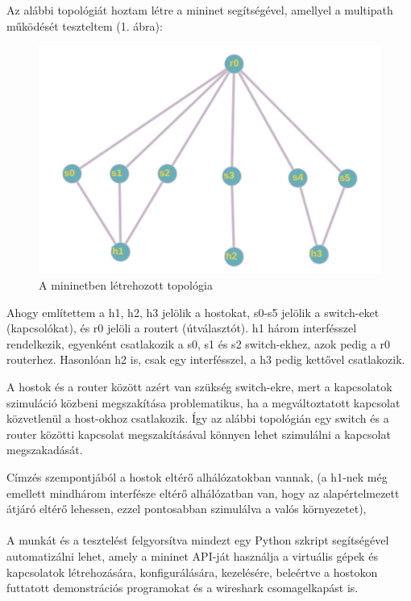 \documentclass[a4paper,oneside]{article}
\begin{document}
Az alábbi topológiát hoztam létre a mininet segítségével, amellyel a multipath működését teszteltem (1. ábra):

\begin{figure}[h]
  \centering
    \includegraphics[width=12cm]{topo}
\caption{A mininetben létrehozott topológia}
\end{figure}
 
Ahogy említettem a h1, h2, h3 jelölik a hostokat, s0-s5 jelölik a switch-eket (kapcsolókat), és r0 jelöli a routert (útválasztót).
h1 három interfésszel rendelkezik, egyenként csatlakozik a s0, s1 és s2 switch-ekhez, azok pedig a r0 routerhez.
Hasonlóan h2 is, csak egy interfésszel, a h3 pedig kettővel csatlakozik.

A hostok és a router között azért van szükség switch-ekre,
mert a kapcsolatok szimuláció közbeni megszakítása problematikus, ha a megváltoztatott kapcsolat közvetlenül a host-okhoz csatlakozik.
Így az alábbi topológián egy switch és a router közötti kapcsolat megszakításával könnyen lehet szimulálni a kapcsolat megszakadását.

Címzés szempontjából a hostok eltérő alhálózatokban vannak, (a h1-nek még emellett 
mindhárom interfésze eltérő alhálózatban van, hogy az alapértelmezett átjáró eltérő lehessen, ezzel pontosabban szimulálva a valós környezetet),

\paragraph{}
A munkát és a tesztelést felgyorsítva mindezt egy Python szkript segítségével automatizálni lehet, 
amely a mininet API-ját használja a virtuális gépek és kapcsolatok létrehozására, konfigurálására, kezelésére, beleértve
a hostokon futtatott demonstrációs programokat és a wireshark csomagelkapást is.
\end{document}

